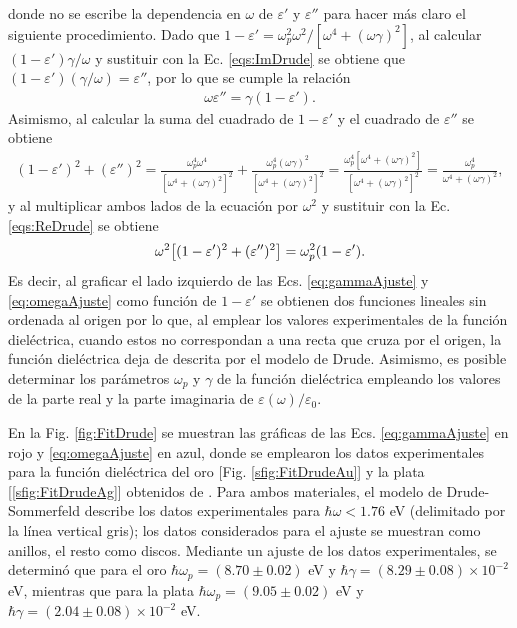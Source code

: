 \noindent		
donde no se escribe la dependencia en $\omega$ de $\varepsilon'$ y $\varepsilon''$ para hacer más claro el siguiente procedimiento. Dado que $1-\varepsilon' = \omega_p^2\omega^2 / [\omega^4 + (\omega\gamma)^2]$, al calcular  $(1-\varepsilon')\gamma/\omega$ y sustituir con la Ec. \eqref{eqs:ImDrude} se obtiene que $	( 1-\varepsilon') (\gamma/\omega)=\varepsilon''$, por lo que se cumple la relación
%
	\begin{align}
	\omega\varepsilon''= \gamma( 1-\varepsilon'). \label{eq:gammaAjuste}
	\end{align}
%
Asimismo, al calcular la suma del cuadrado de $1-\varepsilon'$ y el cuadrado de $\varepsilon''$ se obtiene
%
	\begin{align*}
	( 1-\varepsilon') ^2 + (\varepsilon'')^2 
					=\frac{\omega_p^4 \omega^4}{[\omega^4 + (\omega\gamma)^2]^2}+
									\frac{\omega_p^4 (\omega\gamma)^2}{[\omega^4 + (\omega\gamma)^2]^2}
					= \frac{\omega_p^4[\omega^4 + (\omega\gamma)^2]}{[\omega^4 + (\omega\gamma)^2]^2}
					= \frac{\omega_p^4}{\omega^4 + (\omega\gamma)^2},
		\end{align*}
%
y al multiplicar ambos lados de la ecuación por $\omega^2$	 y sustituir con la Ec. \eqref{eqs:ReDrude} se obtiene
%
	\begin{align}
	\omega^2\qty[( 1-\varepsilon') ^2 + (\varepsilon'')^2 ]  
						= \omega_p^2( 1-\varepsilon').
	\label{eq:omegaAjuste}
	\end{align}
%
Es decir, al graficar el lado izquierdo de las Ecs. \eqref{eq:gammaAjuste} y \eqref{eq:omegaAjuste} como función de $ 1-\varepsilon'$ se obtienen dos funciones lineales sin ordenada al origen por lo que, al emplear los valores experimentales de la función dieléctrica, cuando estos no correspondan a una recta que cruza por el origen, la función dieléctrica deja de descrita por el modelo de Drude. Asimismo, es posible determinar los parámetros $\omega_p$ y $\gamma$ de la función dieléctrica empleando los valores de la parte real y la parte imaginaria de $\varepsilon(\omega)/\varepsilon_0$.

En la Fig.  \ref{fig:FitDrude} se muestran las gráficas de las Ecs. \eqref{eq:gammaAjuste} en rojo y \eqref{eq:omegaAjuste} en azul, donde se emplearon los datos experimentales para la función dieléctrica del oro [Fig. \ref{sfig:FitDrudeAu}] y la plata [\ref{sfig:FitDrudeAg}] obtenidos de \cite{johnson1972constants}. Para ambos materiales, el modelo de Drude-Sommerfeld describe los datos experimentales para $\hbar\omega<1.76$ eV (delimitado por la línea vertical gris); los datos considerados para el ajuste se muestran como anillos, el resto como discos. Mediante un ajuste de los datos experimentales, se determinó que para el oro $\hbar\omega_p=(8.70\pm 0.02)$ eV y $\hbar\gamma = (8.29\pm 0.08)\times 10^{-2}$ eV, mientras que para la plata $\hbar\omega_p=(9.05\pm 0.02)$ eV y $\hbar\gamma = (2.04\pm 0.08)\times 10^{-2}$ eV.


